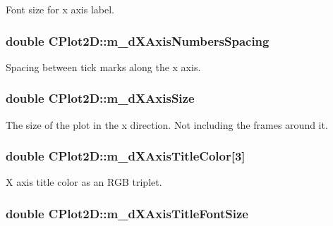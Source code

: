 Font size for x axis label. \hypertarget{class_c_plot2_d_a1f1e193e662c12f604f286583ed96b39}{
\subsubsection[{m\-\_\-d\-X\-Axis\-Numbers\-Spacing}]{\setlength{\rightskip}{0pt plus 5cm}double C\-Plot2\-D\-::m\-\_\-d\-X\-Axis\-Numbers\-Spacing\hspace{0.3cm}{\ttfamily [protected]}}}\label{class_c_plot2_d_a1f1e193e662c12f604f286583ed96b39}
Spacing between tick marks along the x axis. \hypertarget{class_c_plot2_d_a9468ed46a8495be7ea2486e2903a3215}{
\subsubsection[{m\-\_\-d\-X\-Axis\-Size}]{\setlength{\rightskip}{0pt plus 5cm}double C\-Plot2\-D\-::m\-\_\-d\-X\-Axis\-Size\hspace{0.3cm}{\ttfamily [protected]}}}\label{class_c_plot2_d_a9468ed46a8495be7ea2486e2903a3215}
The size of the plot in the x direction. Not including the frames around it. \hypertarget{class_c_plot2_d_a4302878445ce4291c00a70baa448e2d2}{
\subsubsection[{m\-\_\-d\-X\-Axis\-Title\-Color}]{\setlength{\rightskip}{0pt plus 5cm}double C\-Plot2\-D\-::m\-\_\-d\-X\-Axis\-Title\-Color\mbox{[}3\mbox{]}\hspace{0.3cm}{\ttfamily [protected]}}}\label{class_c_plot2_d_a4302878445ce4291c00a70baa448e2d2}
X axis title color as an R\-G\-B triplet. \hypertarget{class_c_plot2_d_a53755986015b3689190dfc4b533f7c36}{
\subsubsection[{m\-\_\-d\-X\-Axis\-Title\-Font\-Size}]{\setlength{\rightskip}{0pt plus 5cm}double C\-Plot2\-D\-::m\-\_\-d\-X\-Axis\-Title\-Font\-Size\hspace{0.3cm}{\ttfamily [protected]}}}\label{class_c_plot2_d_a53755986015b3689190dfc4b533f7c36}
